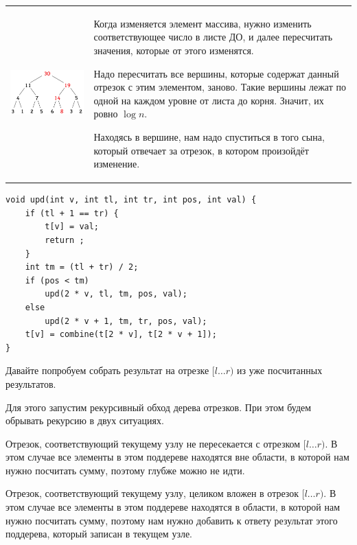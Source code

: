 
\down
\begin{tabular}{cm{}}
	\begin{minipage}{4cm}	
		\includegraphics[scale=0.5]{files/set_example.png}
	\end{minipage}
	&
	Когда изменяется элемент массива, нужно изменить соответствующее число в листе ДО, и далее пересчитать значения, которые от этого изменятся.
	
	Надо пересчитать все вершины, которые содержат данный отрезок с этим элементом, заново. Такие вершины лежат по одной на каждом уровне от листа до корня. Значит, их ровно $\log n$.
	
	Находясь в вершине, нам надо спуститься в того сына, который отвечает за отрезок, в котором произойдёт изменение.
\end{tabular}
\down
\up \up
\begin{verbatim}
void upd(int v, int tl, int tr, int pos, int val) {
	if (tl + 1 == tr) {
		t[v] = val;
		return ;
	}
	int tm = (tl + tr) / 2;
	if (pos < tm)
	    upd(2 * v, tl, tm, pos, val);
	else
	    upd(2 * v + 1, tm, tr, pos, val);
	t[v] = combine(t[2 * v], t[2 * v + 1]);
}
\end{verbatim}

\pagebreak


Давайте попробуем собрать результат на отрезке $[l \ldots r)$ из уже посчитанных результатов.

Для этого запустим рекурсивный обход дерева отрезков. При этом будем обрывать рекурсию в двух ситуациях.


\begin{MyList}[0pt]
	\item Отрезок, соответствующий текущему узлу не пересекается с отрезком $[l \ldots r)$. В этом случае все элементы в этом поддереве находятся вне области, в которой нам нужно посчитать сумму, поэтому глубже можно не идти.
	\down
	\item Отрезок, соответствующий текущему узлу, целиком вложен в отрезок $[l \ldots r)$. В этом случае все элементы в этом поддереве находятся в области, в которой нам нужно посчитать сумму, поэтому нам нужно добавить к ответу результат этого поддерева, который записан в текущем узле.
\end{MyList}

